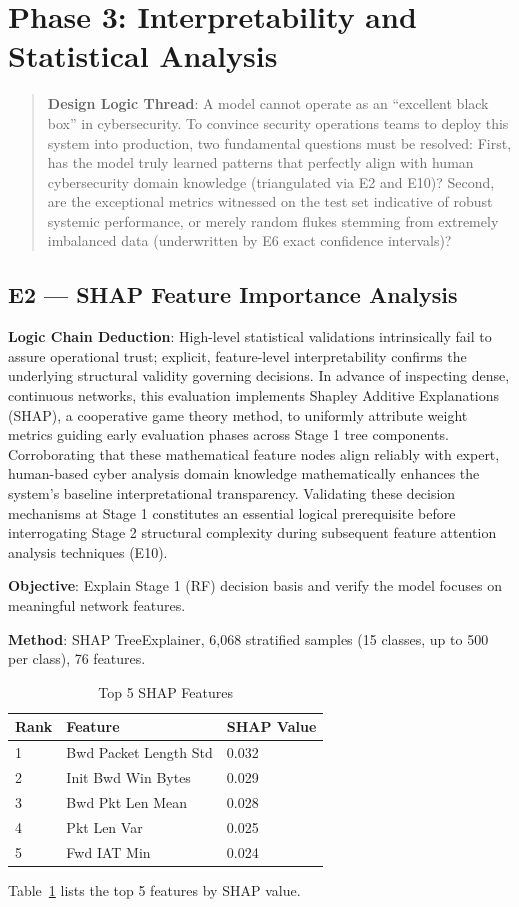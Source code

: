 \documentclass[sigconf]{acmart}
\begin{document}
\section{Phase 3: Interpretability and Statistical Analysis}
\begin{quote}
\textbf{Design Logic Thread}: A model cannot operate as an ``excellent black box'' in cybersecurity. To convince security operations teams to deploy this system into production, two fundamental questions must be resolved: First, has the model truly learned patterns that perfectly align with human cybersecurity domain knowledge (triangulated via E2 and E10)? Second, are the exceptional metrics witnessed on the test set indicative of robust systemic performance, or merely random flukes stemming from extremely imbalanced data (underwritten by E6 exact confidence intervals)?
\end{quote}

\subsection{E2 --- SHAP Feature Importance Analysis}
\textbf{Logic Chain Deduction}: High-level statistical validations intrinsically fail to assure operational trust; explicit, feature-level interpretability confirms the underlying structural validity governing decisions. In advance of inspecting dense, continuous networks, this evaluation implements Shapley Additive Explanations (SHAP), a cooperative game theory method, to uniformly attribute weight metrics guiding early evaluation phases across Stage 1 tree components. Corroborating that these mathematical feature nodes align reliably with expert, human-based cyber analysis domain knowledge mathematically enhances the system's baseline interpretational transparency. Validating these decision mechanisms at Stage 1 constitutes an essential logical prerequisite before interrogating Stage 2 structural complexity during subsequent feature attention analysis techniques (E10).

\textbf{Objective}: Explain Stage 1 (RF) decision basis and verify the model focuses on meaningful network features.

\textbf{Method}: SHAP TreeExplainer, 6,068 stratified samples (15 classes, up to 500 per class), 76 features.

\begin{table}[!h]
\caption{Top 5 SHAP Features}
\label{tab:shap_features}
\begin{tabular}{lll}
\toprule
\textbf{Rank} & \textbf{Feature} & \textbf{SHAP Value} \\
\midrule
1 & Bwd Packet Length Std & 0.032 \\
2 & Init Bwd Win Bytes & 0.029 \\
3 & Bwd Pkt Len Mean & 0.028 \\
4 & Pkt Len Var & 0.025 \\
5 & Fwd IAT Min & 0.024 \\
\bottomrule
\end{tabular}
\end{table}
\noindent Table~\ref{tab:shap_features} lists the top 5 features by SHAP value.
\end{document}
